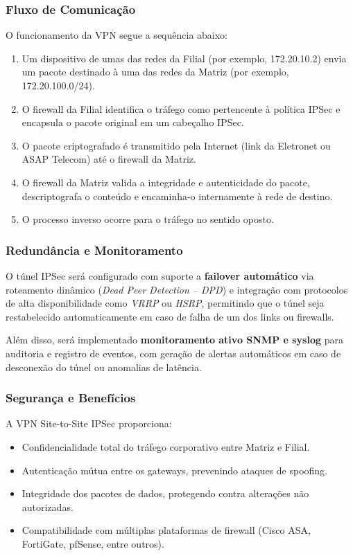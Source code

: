 \documentclass[a4paper, 12pt]{article}
\begin{document}
\subsubsection{Fluxo de Comunicação}
\label{subsubsec:vpn-flow}

O funcionamento da VPN segue a sequência abaixo:
\begin{enumerate}
    \item Um dispositivo de umas das redes da Filial (por exemplo, 172.20.10.2) envia um pacote destinado à uma das redes da Matriz (por exemplo, 172.20.100.0/24).
    \item O firewall da Filial identifica o tráfego como pertencente à política IPSec e encapsula o pacote original em um cabeçalho IPSec.
    \item O pacote criptografado é transmitido pela Internet (link da Eletronet ou ASAP Telecom) até o firewall da Matriz.
    \item O firewall da Matriz valida a integridade e autenticidade do pacote, descriptografa o conteúdo e encaminha-o internamente à rede de destino.
    \item O processo inverso ocorre para o tráfego no sentido oposto.
\end{enumerate}

\subsubsection{Redundância e Monitoramento}
\label{subsubsec:vpn-redundancy}

O túnel IPSec será configurado com suporte a \textbf{failover automático} via roteamento dinâmico (\textit{Dead Peer Detection – DPD}) e integração com protocolos de alta disponibilidade como \textit{VRRP} ou \textit{HSRP}, permitindo que o túnel seja restabelecido automaticamente em caso de falha de um dos links ou firewalls.

Além disso, será implementado \textbf{monitoramento ativo SNMP e syslog} para auditoria e registro de eventos, com geração de alertas automáticos em caso de desconexão do túnel ou anomalias de latência.

\subsubsection{Segurança e Benefícios}
\label{subsubsec:vpn-security}

A VPN Site-to-Site IPSec proporciona:
\begin{itemize}
    \item Confidencialidade total do tráfego corporativo entre Matriz e Filial.
    \item Autenticação mútua entre os gateways, prevenindo ataques de spoofing.
    \item Integridade dos pacotes de dados, protegendo contra alterações não autorizadas.
    \item Compatibilidade com múltiplas plataformas de firewall (Cisco ASA, FortiGate, pfSense, entre outros).
\end{itemize}
\end{document}
